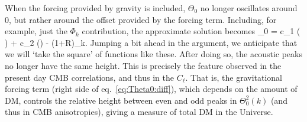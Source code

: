 When the forcing provided by gravity is included, $\Theta_0$ no longer oscillates around $0$, but rather around the offset provided by the forcing term.
Including, for example,  just the $\Phi_k$ contribution, the approximate solution becomes
\beq
\label{eq:Theta0forced}
 \Theta_0 = c_1 \cos\left( \right) + c_2 \sin\left(\right) - (1+R)\Phi_k.
\eeq
Jumping a bit ahead in the argument, we anticipate that we will `take the square' of functions like these. After doing so, the  acoustic peaks no longer have the same height. This is precisely the feature observed in the present day CMB correlations, and thus in the $C_\ell$. That is, the gravitational forcing term (right side of eq.~\eqref{eq:Theta0:diff}), which depends on the amount of DM, controls the relative height between even and odd peaks in $\Theta_0^2(k)$ (and thus in CMB anisotropies), giving a measure of total DM in the Universe. 


